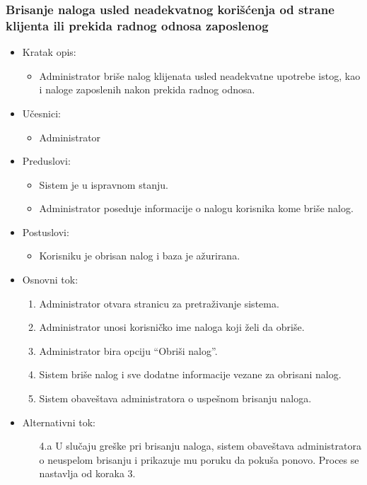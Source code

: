 \subsubsection{Brisanje naloga usled neadekvatnog korišćenja od strane klijenta ili prekida radnog odnosa zaposlenog}

\begin{itemize}
    \item Kratak opis:
        \begin{itemize}
            \item Administrator briše nalog klijenata usled neadekvatne upotrebe istog, kao i naloge zaposlenih nakon prekida radnog odnosa.
        \end{itemize}
    \item Učesnici:
        \begin{itemize}
            \item Administrator
        \end{itemize}
    \item Preduslovi:
        \begin{itemize}
            \item Sistem je u ispravnom stanju.
            \item Administrator poseduje informacije o nalogu korisnika kome briše nalog.
        \end{itemize}
    \item Postuslovi:
        \begin{itemize}
            \item Korisniku je obrisan nalog i baza je ažurirana.
        \end{itemize}
    \item Osnovni tok:
        \begin{enumerate}
         \item Administrator otvara stranicu za pretraživanje sistema.
         \item Administrator unosi korisničko ime naloga koji želi da obriše.
         \item Administrator bira opciju ``Obriši nalog''.
         \item Sistem briše nalog i sve dodatne informacije vezane za obrisani nalog.
         \item Sistem obaveštava administratora o uspešnom brisanju naloga.
        \end{enumerate}
    \item Alternativni tok:
        \begin{itemize}
            \item[4.a] U slučaju greške pri brisanju naloga, sistem obaveštava administratora o neuspelom brisanju i prikazuje mu poruku da pokuša ponovo. Proces se nastavlja od koraka 3.
        \end{itemize}
\end{itemize}


